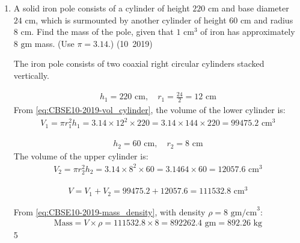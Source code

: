 \begin{enumerate}[label=\thesubsection.\arabic*, ref=\thesubsection.\theenumi]
	The following code generates the geometric construction:
	\begin{lstlisting}[frame=single, basicstyle=\ttfamily\small]
		codes/10/q36.py
	\end{lstlisting}
	


	\item A solid iron pole consists of a cylinder of height $220\text{ cm}$ and base diameter $24\text{ cm}$, which is surmounted by another cylinder of height $60\text{ cm}$ and radius $8\text{ cm}$. Find the mass of the pole, given that $1\text{ cm}^3$ of iron has approximately $8\text{ gm}$ mass. (Use $\pi=3.14$.)
	\hfill (10~2019)
	
	\solution
	The iron pole consists of two coaxial right circular cylinders stacked vertically.
	
	\begin{align}
		h_1 = 220\text{ cm}, \quad r_1 = \frac{24}{2} = 12\text{ cm}
	\end{align}
	From \eqref{eq:CBSE10-2019-vol_cylinder}, the volume of the lower cylinder is:
	\begin{align}
		V_1 = \pi r_1^2 h_1 = 3.14 \times 12^2 \times 220 = 3.14 \times 144 \times 220 = 99475.2\text{ cm}^3
	\end{align}
	
	\begin{align}
		h_2 = 60\text{ cm}, \quad r_2 = 8\text{ cm}
	\end{align}
	The volume of the upper cylinder is:
	\begin{align}
		V_2 = \pi r_2^2 h_2 = 3.14 \times 8^2 \times 60 = 3.14 \text{64} \times 60 = 12057.6\text{ cm}^3
	\end{align}
	
	\begin{align}
		V = V_1 + V_2 = 99475.2 + 12057.6 = 111532.8\text{ cm}^3
	\end{align}
	
	From \eqref{eq:CBSE10-2019-mass_density}, with density $\rho = 8\text{ gm/cm}^3$:
	\begin{align}
		\text{Mass} = V \times \rho = 111532.8 \times 8 = 892262.4\text{ gm} = 892.26\text{ kg}
	\end{align}5
	
	
\end{enumerate}